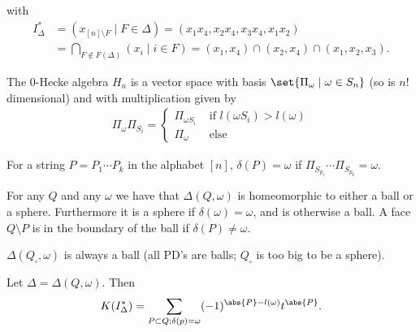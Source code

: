 \begin{example}
\begin{center}
    \end{center}
    with
    \begin{align*}
        I_\Delta^* &= ( x_{[n] \setminus F} \mid F \in \Delta ) = ( x_1  x_4, x_2 x_4 , x_3 x_4 , x_1 x_2 )\\
        &=  \bigcap_{F \notin F(\Delta)} (x_i \mid i \in F) = ( x_1, x_4 ) \cap ( x_2 , x_4 ) \cap ( x_1 , x_2 , x_3).
    \end{align*}
\end{example}

\begin{definition}
    The $0$-Hecke algebra $H_n$ is a vector space with basis $\set{ \Pi_\omega \mid \omega \in S_n}$ (so is $n!$ dimensional) and with multiplication given by
    \begin{align*}
        \Pi_\omega \Pi_{S_i} =
        \begin{cases}
            \Pi_{\omega S_i} & \text{ if } l(\omega S_i ) > l(\omega)\\
            \Pi_\omega & \text{ else}
        \end{cases}
    \end{align*}
\end{definition}

For a string $P = P_1 \cdots P_k$ in the alphabet $[n]$, $\delta (P) = \omega $ if $\Pi_{S_{p_1}} \cdots \Pi_{S_{p_k}} = \omega $.

\begin{theorem}
    For any $Q$ and any $\omega$ we have that $\Delta (Q, \omega) $ is homeomorphic to either a ball or a sphere. Furthermore it is a sphere if $\delta (\omega) = \omega$, and is otherwise a ball. A face $Q \setminus P$ is in the boundary of the ball if $\delta (P) \neq \omega$.
\end{theorem}

\begin{corollary}
    $\Delta (Q_\square , \omega ) $ is always a ball (all PD's are balls; $Q_\square$ is too big to be a sphere).
\end{corollary}

\begin{lemma}
    Let $\Delta = \Delta (Q, \omega)$. Then 
    \begin{align*}
        K( I_\Delta^* ) = \sum_{P \subset Q; \delta (p) = \omega} (-1)^{\abs{P} - l(\omega) } t^{\abs{P}}.
    \end{align*}
\end{lemma}

